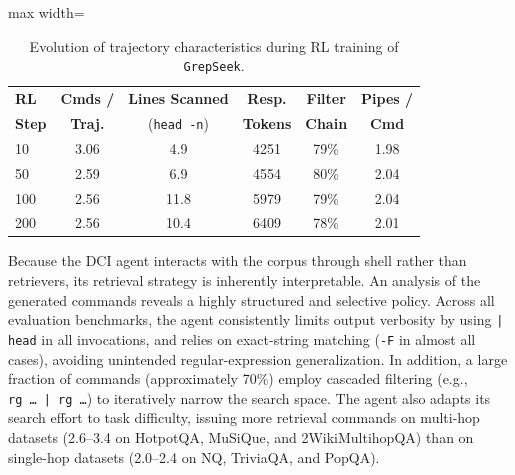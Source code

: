 \documentclass{llmxive}
\providecommand{\ourmethod}{\texttt{GrepSeek}\xspace}
\begin{document}
\begin{table}[t]
\vspace{-0.8cm} %
\centering
\small
\setlength{\tabcolsep}{2.5pt}
\begin{adjustbox}{max width=\linewidth}
\begin{tabular}{l c c c c c}
\toprule
\textbf{RL} & \textbf{Cmds /} & \textbf{Lines Scanned} & \textbf{Resp.} & \textbf{Filter} & \textbf{Pipes /}\\
\textbf{Step} & \textbf{Traj.} & (\texttt{head\,-n}) & \textbf{Tokens} & \textbf{Chain} & \textbf{Cmd}\\
\midrule
10  & 3.06 & 4.9  & 4251 & 79\% & 1.98\\
50  & 2.59 & 6.9  & 4554 & 80\% & 2.04\\
100 & 2.56 & 11.8 & 5979 & 79\% & 2.04\\
200 & 2.56 & 10.4 & 6409 & 78\% & 2.01\\
\bottomrule
\end{tabular}
\end{adjustbox}
\label{tab:cmd-evo}
\vspace{-0.3cm} %

\caption{Evolution of trajectory characteristics during RL training of \ourmethod{}. }
\end{table}

Because the DCI agent interacts with the corpus through shell rather than retrievers, its retrieval strategy is inherently interpretable. An analysis of the generated commands reveals a highly structured and selective policy. Across all evaluation benchmarks, the agent consistently limits output verbosity by using \texttt{|\,head} in all invocations, and relies on exact-string matching (\texttt{-F} in almost all cases), avoiding unintended regular-expression generalization. In addition, a large fraction of commands (approximately 70\%) employ cascaded filtering (e.g., \texttt{rg\,\ldots\,|\,rg\,\ldots}) to iteratively narrow the search space. The agent also adapts its search effort to task difficulty, issuing more retrieval commands on multi-hop datasets (2.6--3.4 on HotpotQA, MuSiQue, and 2WikiMultihopQA) than on single-hop datasets (2.0--2.4 on NQ, TriviaQA, and PopQA).
\end{document}
